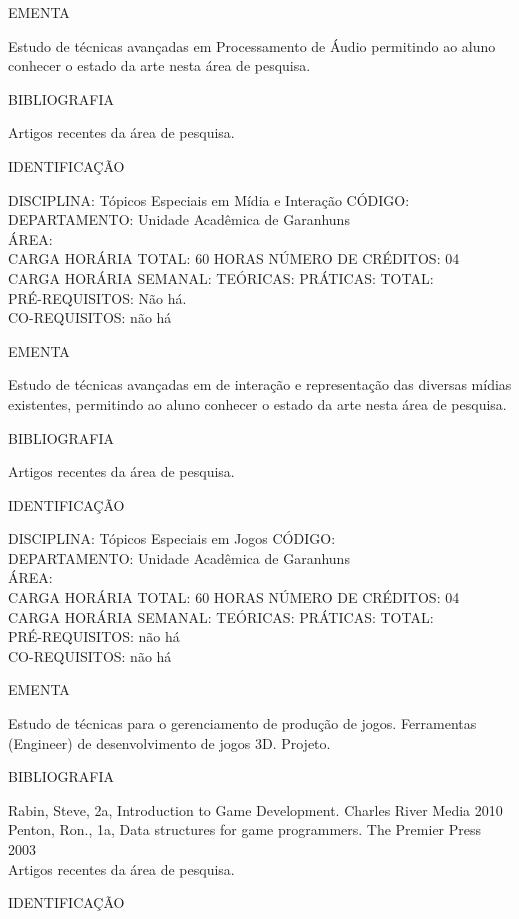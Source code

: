 \documentclass[
	12pt,				%
	openright,			%
  oneside,     %
	a4paper,			%
	english,			%
	french,				%
	spanish,			%
	brazil				%
	]{abntex2}
\begin{document}
\begin{apendicesenv}
EMENTA 

Estudo de técnicas avançadas em Processamento de Áudio permitindo ao
aluno conhecer o estado da arte nesta área de pesquisa.

BIBLIOGRAFIA 

Artigos recentes da área de pesquisa.

\newpage IDENTIFICAÇÃO

DISCIPLINA: Tópicos Especiais em Mídia e Interação CÓDIGO:\\ 
DEPARTAMENTO: Unidade Acadêmica de Garanhuns\\
ÁREA: \\
CARGA HORÁRIA TOTAL: 60 HORAS NÚMERO DE CRÉDITOS: 04\\
CARGA HORÁRIA SEMANAL: TEÓRICAS: PRÁTICAS: TOTAL: \\
PRÉ-REQUISITOS: Não há.\\
CO-REQUISITOS: não há

EMENTA 

Estudo de técnicas avançadas em de interação e representação das
diversas mídias existentes, permitindo ao aluno conhecer o estado da
arte nesta área de pesquisa.

BIBLIOGRAFIA 

Artigos recentes da área de pesquisa.

\newpage IDENTIFICAÇÃO

DISCIPLINA: Tópicos Especiais em Jogos CÓDIGO:\\ 
DEPARTAMENTO: Unidade Acadêmica de Garanhuns\\
ÁREA: \\
CARGA HORÁRIA TOTAL: 60 HORAS NÚMERO DE CRÉDITOS: 04\\
CARGA HORÁRIA SEMANAL: TEÓRICAS: PRÁTICAS: TOTAL: \\
PRÉ-REQUISITOS: não há\\
CO-REQUISITOS: não há

EMENTA 

Estudo de técnicas para o gerenciamento de produção de jogos.
Ferramentas (Engineer) de desenvolvimento de jogos 3D. Projeto.

BIBLIOGRAFIA 

Rabin, Steve, 2a, Introduction to Game Development. Charles River Media
2010\\
Penton, Ron., 1a, Data structures for game programmers. The Premier
Press 2003\\
Artigos recentes da área de pesquisa.

\newpage IDENTIFICAÇÃO


\end{apendicesenv}
\end{document}
